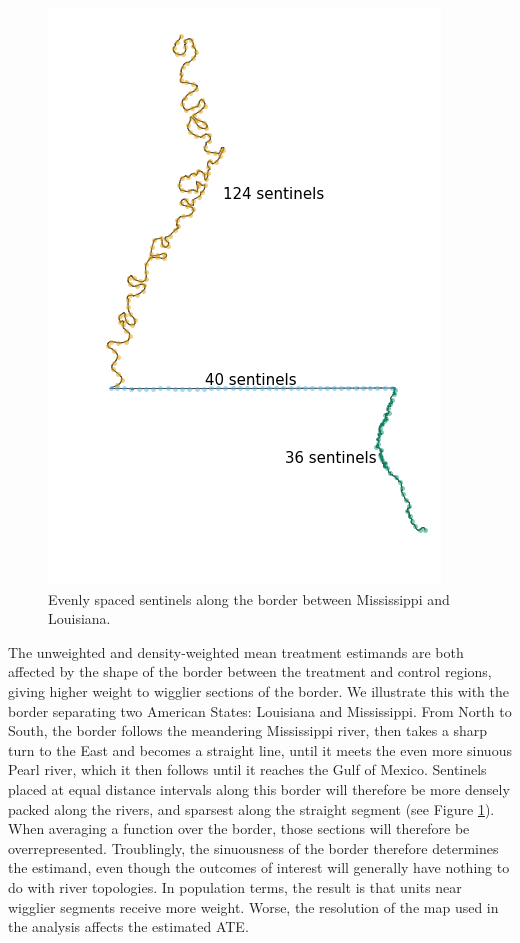 \documentclass[letter]{article}
\makeatletter
\def\maxwidth{\ifdim\Gin@nat@width>\linewidth\linewidth
\else\Gin@nat@width\fi}
\let\Oldincludegraphics\includegraphics
\renewcommand{\includegraphics}[1]{\Oldincludegraphics[width=0.9\maxwidth]{#1}}
\makeatother
\begin{document}
\label{sec:invvar}
    


    	\begin{figure}
\centering
\includegraphics{../figures/mississippi_counts.png}
\caption{\label{fig:mississippi_counts} Evenly spaced sentinels along the border between Mississippi and Louisiana.}
\end{figure}

The unweighted and density-weighted mean treatment estimands are both affected by the shape of the border between the treatment and control regions,
giving higher weight to wigglier sections of the border.
We illustrate this with the border separating two American States: Louisiana and Mississippi.
From North to South, the border follows the meandering Mississippi river, then takes a sharp turn to the East and becomes a straight line, until it meets the even more sinuous Pearl river, which it then follows until it reaches the Gulf of Mexico.
Sentinels placed at equal distance intervals along this border will therefore be more densely packed along the rivers, and sparsest along the straight segment (see Figure \ref{fig:mississippi_counts}).
When averaging a function over the border, those sections will therefore be overrepresented.
Troublingly, the sinuousness of the border therefore determines the estimand, even though the outcomes of interest will generally have nothing to do with river topologies.
In population terms, the result is that units near wigglier segments receive more weight.
Worse, the resolution of the map used in the analysis affects the estimated ATE.
\end{document}
